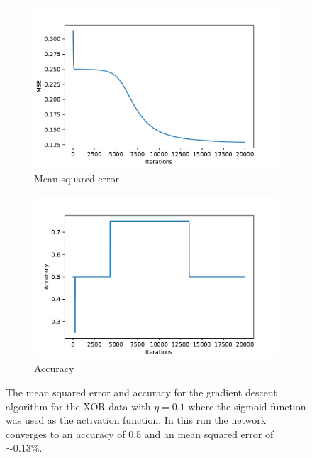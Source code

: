 \documentclass[10 pt, a4paper]{article}
\begin{document}
\begin{figure}[H] 
\begin{subfigure}[b]{0.5\textwidth}
  \centering
    \includegraphics[width=\textwidth]{xor_mse_fail}
  \caption{Mean squared error}
\end{subfigure}
\begin{subfigure}[b]{0.5\textwidth} 
  \centering
    \includegraphics[width=\textwidth]{xor_acc_fail}
  \caption{Accuracy}
\end{subfigure}
\caption{The mean squared error and accuracy for the gradient descent algorithm for the XOR data with $\eta = 0.1$ where the sigmoid function was used as the activation function. In this run the network converges to an accuracy of 0.5 and an mean squared error of $\sim 0.13\%$.}
  \label{fig:xormsefail}
\end{figure}
\end{document}
